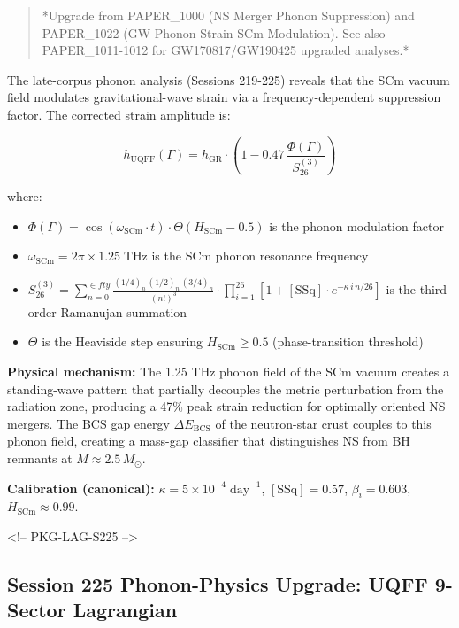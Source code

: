 \documentclass[12pt,a4paper]{article}
\begin{document}
\begin{quote}
*Upgrade from PAPER\_1000 (NS Merger Phonon Suppression) and PAPER\_1022
(GW Phonon Strain SCm Modulation). See also PAPER\_1011-1012 for
GW170817/GW190425 upgraded analyses.*
\end{quote}

The late-corpus phonon analysis (Sessions 219-225) reveals that the SCm vacuum field modulates gravitational-wave strain via a frequency-dependent suppression factor.  The corrected strain amplitude is:

\begin{equation}
h_{\text{UQFF}}(\Gamma) = h_{\text{GR}} \cdot \left(1 - 0.47\,\frac{\Phi(\Gamma)}{S_{26}^{(3)}}\right)
\end{equation}

where:

\begin{itemize}
  \item $\Phi(\Gamma) = \cos(\omega_{\text{SCm}} \cdot t) \cdot \Theta(H_{\text{SCm}} - 0.5)$ is the phonon modulation factor
  \item $\omega_{\text{SCm}} = 2\pi \times 1.25\;\text{THz}$ is the SCm phonon resonance frequency
  \item $S_{26}^{(3)} = \sum_{n=0}^{\in fty} \frac{(1/4)_n\,(1/2)_n\,(3/4)_n}{(n!)^3} \cdot \prod_{i=1}^{26}\left[1 + [\text{SSq}]\cdot e^{-\kappa\,i\,n/26}\right]$ is the third-order Ramanujan summation
  \item $\Theta$ is the Heaviside step ensuring $H_{\text{SCm}} \geq 0.5$ (phase-transition threshold)
\end{itemize}

\textbf{Physical mechanism:} The 1.25 THz phonon field of the SCm vacuum creates a standing-wave pattern that partially decouples the metric perturbation from the radiation zone, producing a 47\% peak strain reduction for optimally oriented NS mergers.  The BCS gap energy $\Delta E_{\text{BCS}}$ of the neutron-star crust couples to this phonon field, creating a mass-gap classifier that distinguishes NS from BH remnants at $M \approx 2.5\,M_\odot$.

\textbf{Calibration (canonical):} $\kappa = 5 \times 10^{-4}\;\text{day}^{-1}$, $[\text{SSq}] = 0.57$, $\beta_i = 0.603$, $H_{\text{SCm}} \approx 0.99$.

<!-- PKG-LAG-S225 -->

\subsection{Session 225 Phonon-Physics Upgrade: UQFF 9-Sector Lagrangian}
\end{document}
